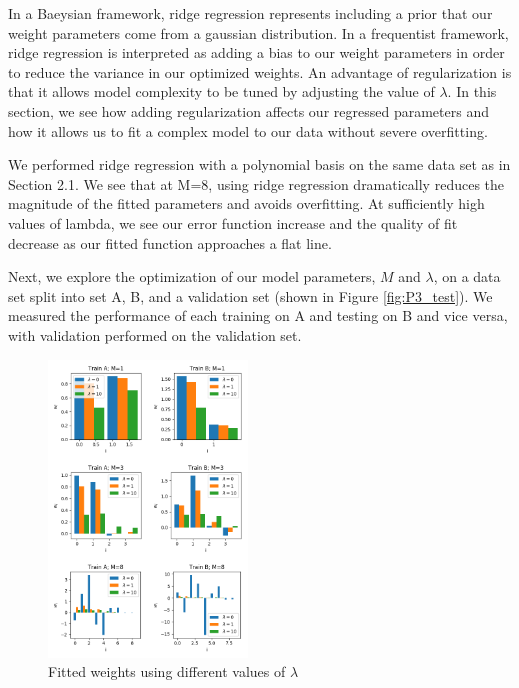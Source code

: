 \documentclass[10pt, twocolumn]{article}
\begin{document}
In a Baeysian framework, ridge regression represents including a prior that our weight parameters come from a gaussian distribution. In a frequentist framework, ridge regression is interpreted as adding a bias to our weight parameters in order to reduce the variance in our optimized weights. An advantage of regularization is that it allows model complexity to be tuned by adjusting the value of $\lambda$. In this section, we see how adding regularization affects our regressed parameters and how it allows us to fit a complex model to our data without severe overfitting.


We performed ridge regression with a polynomial basis on the same data set as in Section 2.1. We see that at M=8, using ridge regression dramatically reduces the magnitude of the fitted parameters and avoids overfitting. At sufficiently high values of lambda, we see our error function increase and the quality of fit decrease as our fitted function approaches a flat line.


Next, we explore the optimization of our model parameters, $M$ and $\lambda$, on a data set split into set A, B, and a validation set (shown in Figure \ref{fig:P3_test}). We measured the performance of each training on A and testing on B and vice versa, with validation performed on the validation set.

\begin{figure}
\caption{Fitted weights using different values of $\lambda$}
\begin{center}
\includegraphics[width=200px]{P3_all_weights}
\end{center}
\label{fig:P3_all_weights}
\end{figure}
\end{document}
